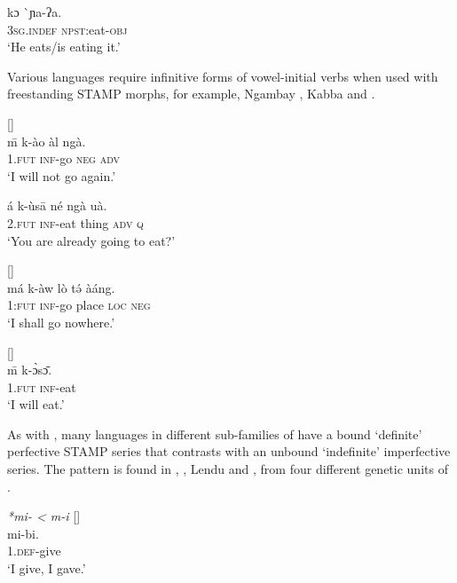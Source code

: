 \documentclass[output=paper]{langsci/langscibook}
\begin{document}
\ex\label{ex:anderson:47b}
\gll kɔ    \`{}ɲa-ʔa.\\
  3\textsc{sg.indef}  \textsc{npst}:eat-\textsc{obj}\\
\glt `He eats/is eating it.'
\z
\z

Various  languages require infinitive forms of vowel-initial verbs when used with freestanding STAMP morphs, for example, Ngambay , Kabba  and  .

\ea\label{ex:anderson:48}
 \citep[118]{Vandame1963}      []\\
\ea\label{ex:anderson:48a}
\={m}    k-ào   àl   ngà.\\
   1.\textsc{fut}   \textsc{inf}-go  \textsc{neg}   \textsc{adv}\\
\glt `I will not go again.'

\ex \label{ex:anderson:48b}
\gll á   k-ùs\={a}    né   ngà   uà.\\
 2.\textsc{fut}   \textsc{inf}-eat thing   \textsc{adv}   \textsc{q}\\
\glt `You are already going to eat?'
\z
\z

\ea\label{ex:anderson:49}
  \citep[220]{Moser2004}         []\\
\gll má  k-àw  lò  t\'{ə}  àáng.    \\
1:\textsc{fut}  \textsc{inf}-go  place  \textsc{loc}  \textsc{neg}    \\
\glt `I shall go nowhere.'
\z

\ea\label{ex:anderson:50}
  \citep[15]{Neukom2010}        []\\
\gll \={m}    k-\`{ɔ}s\={ɔ}.\\
1.\textsc{fut}  \textsc{inf}-eat\\
\glt `I will eat.'
\z

As with , many languages in different sub-families of  have a bound `definite' perfective STAMP series that contrasts with an unbound `indefinite' imperfective series. The pattern is found in  ,  , Lendu  and  , from four different genetic units of . 

\ea\label{ex:anderson:51}
   \textit{*mi- < m-i} \citep[75]{TuckerBryan1966}    []\\
\ea\label{ex:anderson:51a}
\gll mi-bi.\\
1.\textsc{def}-give\\
\glt `I give, I gave.'
\end{document}
